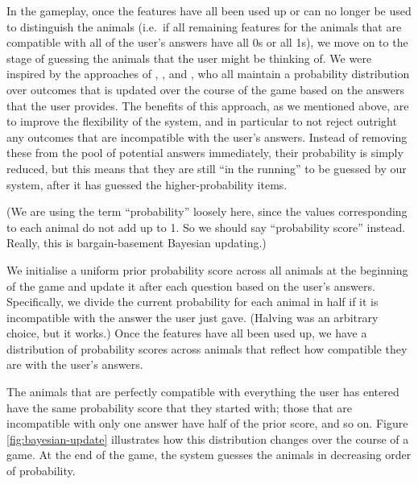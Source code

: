 \documentclass[11pt,a4paper]{article}
\begin{document}
In the gameplay, once the features have all been used up or can no longer be used to distinguish the animals (i.e.\ if all remaining features for the animals that are compatible with all of the user's answers have all 0s or all 1s), we move on to the stage of guessing the animals that the user might be thinking of.
We were inspired by the approaches of \citet{DeyEa2019}, \citet{HuEa2018}, and \citet{Burgener2006}, who all maintain a probability distribution over outcomes that is updated over the course of the game based on the answers that the user provides.
The benefits of this approach, as we mentioned above, are to improve the flexibility of the system, and in particular to not reject outright any outcomes that are incompatible with the user's answers.
Instead of removing these from the pool of potential answers immediately, their probability is simply reduced, but this means that they are still ``in the running'' to be guessed by our system, after it has guessed the higher-probability items.

(We are using the term ``probability'' loosely here, since the values corresponding to each animal do not add up to 1.
So we should say ``probability score'' instead.
Really, this is bargain-basement Bayesian updating.)

We initialise a uniform prior probability score across all animals at the beginning of the game and update it after each question based on the user's answers.
Specifically, we divide the current probability for each animal in half if it is incompatible with the answer the user just gave.
(Halving was an arbitrary choice, but it works.)
Once the features have all been used up, we have a distribution of probability scores across animals that reflect how compatible they are with the user's answers.

The animals that are perfectly compatible with everything the user has entered have the same probability score that they started with; those that are incompatible with only one answer have half of the prior score, and so on.
Figure \ref{fig:bayesian-update} illustrates how this distribution changes over the course of a game.
At the end of the game, the system guesses the animals in decreasing order of probability.
\end{document}
